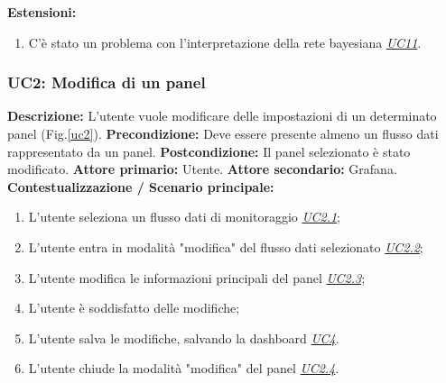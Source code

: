                     \textbf{Estensioni:} \begin{enumerate}
                            \item C’è stato un problema con l’interpretazione della rete bayesiana \underline{\textit{UC11}}.
                        \end{enumerate}
                        
                
                        
                \subsubsection{UC2: Modifica di un panel}
                    \textbf{Descrizione:} L’utente vuole modificare delle impostazioni di un determinato panel (Fig.\ref{uc2}).
                    \newline
                    \textbf{Precondizione:} Deve essere presente almeno un flusso dati rappresentato da un panel.
                    \newline
                    \textbf{Postcondizione:} Il panel selezionato è stato modificato.
                    \newline
                    \textbf{Attore primario:} Utente.
                    \newline
                    \textbf{Attore secondario:} Grafana.
                    \newline
                    \textbf{Contestualizzazione / Scenario principale:} \begin{enumerate}
                        \item L’utente seleziona un flusso dati di monitoraggio \underline{\textit{UC2.1}};
                        \item L’utente entra in modalità "modifica" del flusso dati selezionato \underline{\textit{UC2.2}};
                        \item L’utente modifica le informazioni principali del panel \underline{\textit{UC2.3}};
                        \item L’utente è soddisfatto delle modifiche;
                        \item L'utente salva le modifiche, salvando la dashboard \underline{\textit{UC4}}.
                        \item L’utente chiude la modalità "modifica" del panel \underline{\textit{UC2.4}}.
                    \end{enumerate}
                    
